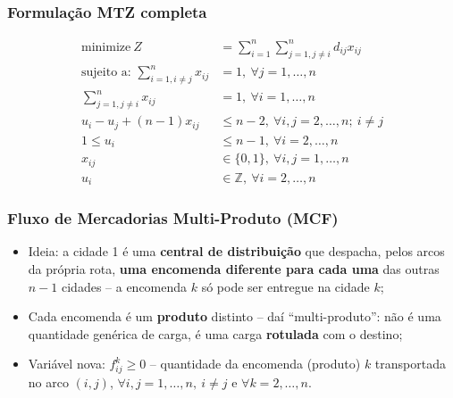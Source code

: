 \documentclass[fleqn]{beamer}
\begin{document}
\begin{frame}
	\frametitle{Formulação MTZ completa}
	\begin{align*}
		\text{minimize}~Z &= \sum_{i=1}^{n}\sum_{j=1,j\neq i}^{n} d_{ij}x_{ij} \\
		\text{sujeito a: } \sum_{i=1,i\neq j}^{n} x_{ij} &= 1,~\forall j = 1,\ldots,n \\
		\sum_{j=1,j\neq i}^{n} x_{ij} &= 1,~\forall i = 1,\ldots,n \\
		u_i - u_j + (n-1)x_{ij} &\leq n-2,~\forall i,j = 2,\ldots,n;~i\neq j \\
		1 \leq u_i &\leq n-1,~\forall i = 2,\ldots,n \\
		x_{ij} &\in \{0,1\},~\forall i,j = 1,\ldots,n \\
		u_i &\in \mathbb{Z},~\forall i = 2,\ldots,n
	\end{align*}
\end{frame}

\begin{frame}
	\frametitle{Fluxo de Mercadorias Multi-Produto (MCF)}
	\begin{itemize}
		\item Ideia: a cidade 1 é uma \textbf{central de distribuição} que
			despacha, pelos arcos da própria rota, \textbf{uma
			encomenda diferente para cada uma} das outras $n-1$ cidades
			-- a encomenda $k$ só pode ser entregue na cidade $k$;
		\item Cada encomenda é um \textbf{produto} distinto -- daí
			``multi-produto'': não é uma quantidade genérica de carga, é
			uma carga \textbf{rotulada} com o destino;
		\item Variável nova: $f_{ij}^{k} \geq 0$ -- quantidade da
			encomenda (produto) $k$ transportada no arco $(i,j)$, $\forall
			i,j = 1,\ldots,n,~i\neq j$ e $\forall k = 2,\ldots,n$.
	\end{itemize}
\end{frame}
\end{document}
